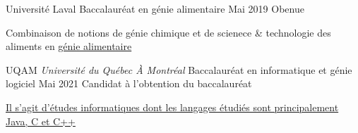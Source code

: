 

\begin{cventries}

  \cventry
    {Université Laval} %
    {Baccalauréat en génie alimentaire} %
    {Mai 2019} %
    {Obenue} %
    {
      \begin{cvitems} %
        \item{Combinaison de notions de génie chimique
            et de scienece \& technologie des aliments en
              \href{https://www.ulaval.ca/les-etudes/programmes/repertoire/details/baccalaureat-en-genie-alimentaire-b-ing.html}
                   {génie alimentaire}}
      \end{cvitems}
    }

  \cventry
    {UQAM \textit{Université du Québec À Montréal}} %
    {Baccalauréat en informatique et génie logiciel} %
    {Mai 2021} %
    {Candidat à l'obtention du baccalauréat} %
    {
      \begin{cvitems} %
        \item{\href{https://etudier.uqam.ca/programme?code=7416}
             {Il s'agit d'études informatiques dont les langages étudiés
              sont principalement Java, C et C++}}
      \end{cvitems}
    }

\end{cventries}
